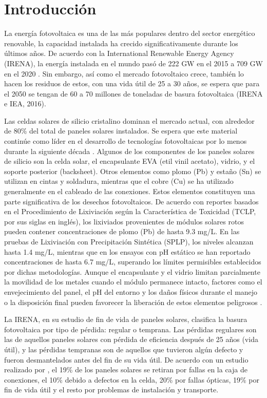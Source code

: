 
\section{Introducción}
\label{sec:Introducción}
La energía fotovoltaica es una de las más populares dentro del sector energético renovable, la capacidad instalada ha crecido significativamente durante los últimos años. De acuerdo con la International Renewable Energy Agency (IRENA), la energía instalada en el mundo pasó de 222 GW en el 2015 a 709 GW en el 2020 \citep{IRENA2020}. Sin embargo, así como el mercado fotovoltaico crece, también lo hacen los residuos de estos, con una vida útil de 25 a 30 años, se espera que para el 2050 se tengan de 60 a 70 millones de toneladas de basura fotovoltaica (IRENA e IEA, 2016). 
 
 Las celdas solares de silicio cristalino dominan el mercado actual, con alrededor de 80\% del total de paneles solares instalados. Se espera que este material continúe como líder en el desarrollo de tecnologías fotovoltaicas por lo menos durante la siguiente década \citep{Tokoro2021}. Algunos de los componentes de los paneles solares de silicio son la celda solar, el encapsulante EVA (etil vinil acetato), vidrio, y el soporte posterior (backsheet). Otros elementos como plomo (Pb) y estaño (Sn) se utilizan en cintas y soldadura, mientras que el cobre (Cu) se ha utilizado generalmente en el cableado de las conexiones. Estos elementos constituyen una parte significativa de los desechos fotovoltaicos. De acuerdo con reportes basados en el Procedimiento de Lixiviación según la Característica de Toxicidad (TCLP, por sus siglas en inglés), los lixiviados provenientes de módulos solares rotos pueden contener concentraciones de plomo (Pb) de hasta 9.3 mg/L. En las pruebas de Lixiviación con Precipitación Sintética (SPLP), los niveles alcanzan hasta 1.4 mg/L, mientras que en los ensayos con pH estático se han reportado concentraciones de hasta 6.7 mg/L, superando los límites permisibles establecidos por dichas metodologías. Aunque el encapsulante y el vidrio limitan parcialmente la movilidad de los metales cuando el módulo permanece intacto, factores como el envejecimiento del panel, el pH del entorno y los daños físicos durante el manejo o la disposición final pueden favorecer la liberación de estos elementos peligrosos \citep{Bhakta2021}. 
 
 La IRENA, en su estudio de fin de vida de paneles solares, clasifica la basura fotovoltaica por tipo de pérdida: regular o temprana. Las pérdidas regulares son las de aquellos paneles solares con pérdida de eficiencia después de 25 años (vida útil), y las pérdidas tempranas son de aquellos que tuvieron algún defecto y fueron desmantelados antes del fin de su vida útil. De acuerdo con un estudio realizado por \citet{Chow2020}, el 19\% de los paneles solares se retiran por fallas en la caja de conexiones, el 10\% debido a defectos en la celda, 20\% por fallas ópticas, 19\% por fin de vida útil y el resto por problemas de instalación y transporte.
 
